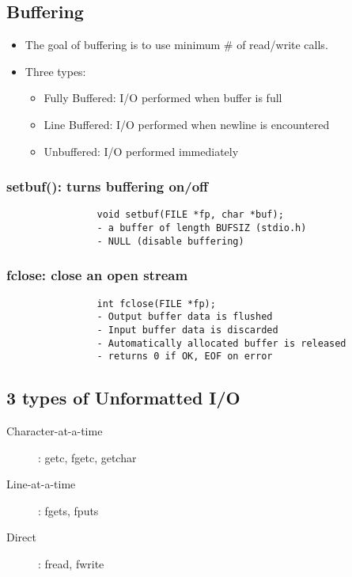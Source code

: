 \documentclass[10pt]{article}
\begin{document}
\begin{multicols}{2}
\begin{minipage}{\columnwidth}
\begin{flushright}
            \subsection*{Buffering}
            \begin{itemize}
                \item The goal of buffering is to use minimum \# of read/write calls.
                \item Three types:
                      \begin{itemize}
                          \item Fully Buffered: I/O performed when buffer is full
                          \item Line Buffered: I/O performed when newline is encountered
                          \item Unbuffered: I/O performed immediately
                      \end{itemize}
            \end{itemize}
            \subsubsection*{setbuf(): turns buffering on/off}
            \begin{lstlisting}
                void setbuf(FILE *fp, char *buf);
                - a buffer of length BUFSIZ (stdio.h)
                - NULL (disable buffering)
            \end{lstlisting}
            \subsubsection*{fclose: close an open stream}
            \begin{lstlisting}
                int fclose(FILE *fp);
                - Output buffer data is flushed
                - Input buffer data is discarded
                - Automatically allocated buffer is released
                - returns 0 if OK, EOF on error
            \end{lstlisting}
            \vspace*{-1em}
            \subsection*{3 types of Unformatted I/O}
            \begin{description}
                \item[Character-at-a-time]: getc, fgetc, getchar
                \item[Line-at-a-time]: fgets, fputs
                \item[Direct]: fread, fwrite
            \end{description}

\end{flushright}
\end{minipage}
\end{multicols}
\end{document}
